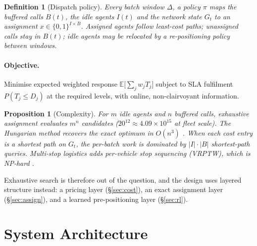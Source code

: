 \documentclass[11pt,a4paper]{article}
\theoremstyle{spaceddef}
\newtheorem{definition}{Definition}[section]
\theoremstyle{spacedplain}
\newtheorem{proposition}{Proposition}[section]
\begin{document}
\begin{definition}[Dispatch policy]
Every batch window $\Delta$, a policy $\pi$ maps the buffered calls $B(t)$, the
idle agents $I(t)$ and the network state $G_t$ to an assignment
$x\in\{0,1\}^{I\times B}$. Assigned agents follow least-cost paths; unassigned
calls stay in $B(t)$; idle agents may be relocated by a re-positioning policy
between windows.
\end{definition}

\paragraph{Objective.} Minimise expected weighted response $\mathbb{E}\bigl[\sum_j w_j T_j\bigr]$
subject to SLA fulfilment $P(T_j\le D_j)$ at the required levels, with online,
non-clairvoyant information.

\begin{proposition}[Complexity]\label{prop:complexity}
For $m$ idle agents and $n$ buffered calls, exhaustive assignment evaluates
$m^{n}$ candidates ($20^{12}\approx4.09\times10^{15}$ at fleet scale). The
Hungarian method recovers the exact optimum in $O(n^{3})$ \cite{kuhn1955}. When each
cost entry is a shortest path on $G_t$, the per-batch work is dominated by
$|I|\cdot|B|$ shortest-path queries. Multi-stop logistics adds per-vehicle stop
sequencing (VRPTW), which is NP-hard \cite{solomon1987}.
\end{proposition}

Exhaustive search is therefore out of the question, and the design uses layered
structure instead: a pricing layer (\S\ref{sec:cost}), an exact assignment layer
(\S\ref{sec:assign}), and a learned pre-positioning layer (\S\ref{sec:rl}).

\section{System Architecture}\label{sec:arch}
\end{document}
